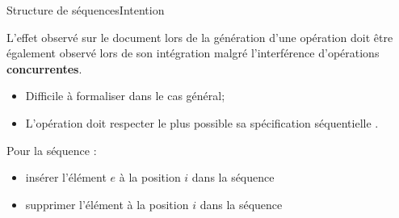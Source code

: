 \begin{frame}{Structure de séquences}{Intention}
  
  L'effet observé sur le document lors de la génération d'une opération doit
  être également observé lors de son intégration malgré l'interférence
  d'opérations \textbf{concurrentes}.

  \vspace{0.5cm}

  \begin{itemize}
  \item Difficile à formaliser dans le cas général;
  \item L'opération doit respecter le plus possible sa spécification séquentielle \REF.
  \end{itemize}

  \vspace{0.5cm}
  
  Pour la séquence :
  \begin{itemize}
  \item \og insérer l'élément $e$ à la position $i$ dans la séquence \fg
  \item \og supprimer l'élément à la position $i$ dans la séquence \fg
  \end{itemize}

  \vspace{0.5cm}

  \begin{itemize}
  \end{itemize}
  
\end{frame}

